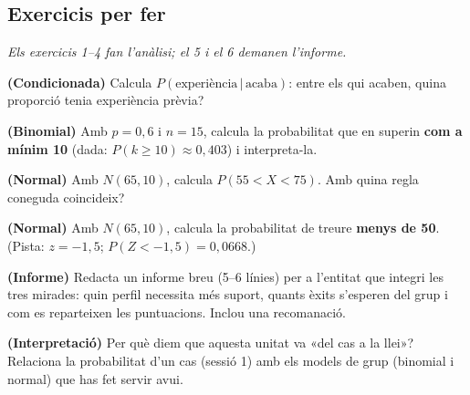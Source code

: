 \subsection{Exercicis per fer}

\noindent\textit{Els exercicis 1--4 fan l'anàlisi; el 5 i el 6 demanen l'informe.}

\begin{exercicis}
\begin{exlist}
  \item \textbf{(Condicionada)} Calcula $P(\text{experiència}\,|\,\text{acaba})$: entre
        els qui acaben, quina proporció tenia experiència prèvia?
  \item \textbf{(Binomial)} Amb $p=0,6$ i $n=15$, calcula la probabilitat que en superin
        \textbf{com a mínim 10} (dada: $P(k\ge 10)\approx 0,403$) i interpreta-la.
  \item \textbf{(Normal)} Amb $N(65,10)$, calcula $P(55<X<75)$. Amb quina regla coneguda
        coincideix?
  \item \textbf{(Normal)} Amb $N(65,10)$, calcula la probabilitat de treure \textbf{menys
        de 50}. (Pista: $z=-1,5$; $P(Z<-1,5)=0,0668$.)
  \item \textbf{(Informe)} Redacta un informe breu (5--6 línies) per a l'entitat que
        integri les tres mirades: quin perfil necessita més suport, quants èxits s'esperen
        del grup i com es reparteixen les puntuacions. Inclou una recomanació.
  \item \textbf{(Interpretació)} Per què diem que aquesta unitat va «del cas a la llei»?
        Relaciona la probabilitat d'un cas (sessió 1) amb els models de grup (binomial i
        normal) que has fet servir avui.
\end{exlist}
\end{exercicis}

